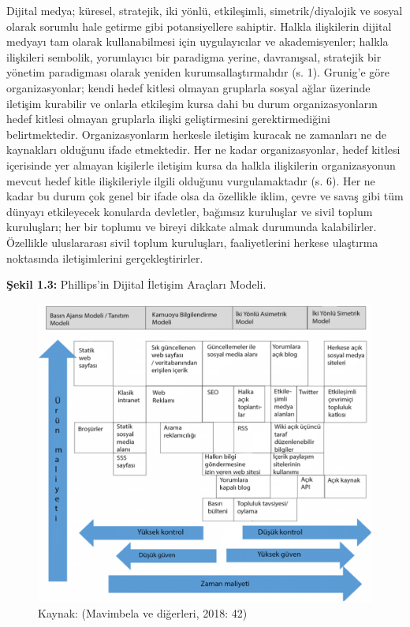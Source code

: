 \documentclass[
]{book}
\begin{document}
Dijital medya; küresel, stratejik, iki yönlü, etkileşimli, simetrik/diyalojik ve sosyal olarak sorumlu hale getirme gibi potansiyellere sahiptir. Halkla ilişkilerin dijital medyayı tam olarak kullanabilmesi için uygulayıcılar ve akademisyenler; halkla ilişkileri sembolik, yorumlayıcı bir paradigma yerine, davranışsal, stratejik bir yönetim paradigması olarak yeniden kurumsallaştırmalıdır (s. 1). \citep{grunig2009paradigms} Grunig'e göre organizasyonlar; kendi hedef kitlesi olmayan gruplarla sosyal ağlar üzerinde iletişim kurabilir ve onlarla etkileşim kursa dahi bu durum organizasyonların hedef kitlesi olmayan gruplarla ilişki geliştirmesini gerektirmediğini belirtmektedir. Organizasyonların herkesle iletişim kuracak ne zamanları ne de kaynakları olduğunu ifade etmektedir. Her ne kadar organizasyonlar, hedef kitlesi içerisinde yer almayan kişilerle iletişim kursa da halkla ilişkilerin organizasyonun mevcut hedef kitle ilişkileriyle ilgili olduğunu vurgulamaktadır (s. 6). \citep{grunig2009paradigms} Her ne kadar bu durum çok genel bir ifade olsa da özellikle iklim, çevre ve savaş gibi tüm dünyayı etkileyecek konularda devletler, bağımsız kuruluşlar ve sivil toplum kuruluşları; her bir toplumu ve bireyi dikkate almak durumunda kalabilirler. Özellikle uluslararası sivil toplum kuruluşları, faaliyetlerini herkese ulaştırma noktasında iletişimlerini gerçekleştirirler.

\textbf{Şekil 1.3:} Phillips'in Dijital İletişim Araçları Modeli.

\begin{figure}
\includegraphics[width=0.95\linewidth,height=0.95\textheight]{tablolar-sekiller/sekil-1} \caption{Kaynak: (Mavimbela ve diğerleri, 2018: 42)}\label{fig:unnamed-chunk-3}
\end{figure}
\end{document}
